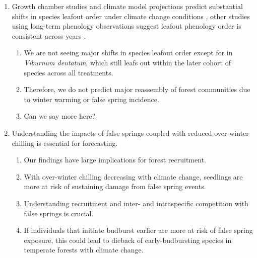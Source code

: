 \documentclass{article}\usepackage[]{graphicx}\usepackage[]{color}
\begin{document}
\begin{enumerate}
\item Growth chamber studies and climate model projections predict substantial shifts in species leafout order under climate change conditions \citep{Roberts2015, Laube2014}, other studies using long-term phenology observations suggest leafout phenology order is consistent across years \citep{Wesolowski2006}.
  \begin{enumerate}
  \item We are not seeing major shifts in species leafout order except for in \textit{Viburnum dentatum}, which still leafs out within the later cohort of species across all treatments.
  \item Therefore, we do not predict major reassembly of forest communities due to winter warming or false spring incidence. 
  \item Can we say more here? %
    \end{enumerate}
  

\item Understanding the impacts of false springs coupled with reduced over-winter chilling is essential for forecasting.
  \begin{enumerate}
  \item Our findings have large implications for forest recruitment.
  \item With over-winter chilling decreasing with climate change, seedlings are more at risk of sustaining damage from false spring events. 
  \item Understanding recruitment and inter- and intraspecific competition with false springs is crucial. 
  \item If individuals that initiate budburst earlier are more at risk of false spring exposure, this could lead to dieback of early-budbursting species in temperate forests with climate change.     %
  \end{enumerate}
\end{enumerate}
\end{document}
